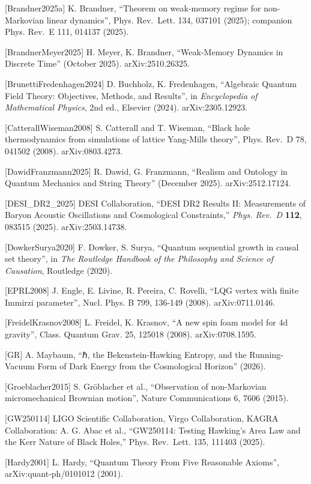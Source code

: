 \documentclass[
]{article}
\begin{document}
{[}Brandner2025a{]} K. Brandner, ``Theorem on weak-memory regime for
non-Markovian linear dynamics'', Phys. Rev.~Lett. 134, 037101 (2025);
companion Phys. Rev.~E 111, 014137 (2025).

{[}BrandnerMeyer2025{]} H. Meyer, K. Brandner, ``Weak-Memory Dynamics in
Discrete Time'' (October 2025). arXiv:2510.26325.

{[}BrunettiFredenhagen2024{]} D. Buchholz, K. Fredenhagen, ``Algebraic
Quantum Field Theory: Objectives, Methods, and Results'', in
\emph{Encyclopedia of Mathematical Physics}, 2nd ed., Elsevier (2024).
arXiv:2305.12923.

{[}CatterallWiseman2008{]} S. Catterall and T. Wiseman, ``Black hole
thermodynamics from simulations of lattice Yang-Mills theory'', Phys.
Rev.~D 78, 041502 (2008). arXiv:0803.4273.

{[}DawidFranzmann2025{]} R. Dawid, G. Franzmann, ``Realism and Ontology
in Quantum Mechanics and String Theory'' (December 2025).
arXiv:2512.17124.

{[}DESI\_DR2\_2025{]} DESI Collaboration, ``DESI DR2 Results II:
Measurements of Baryon Acoustic Oscillations and Cosmological
Constraints,'' \emph{Phys. Rev.~D} \textbf{112}, 083515 (2025).
arXiv:2503.14738.

{[}DowkerSurya2020{]} F. Dowker, S. Surya, ``Quantum sequential growth
in causal set theory'', in \emph{The Routledge Handbook of the
Philosophy and Science of Causation}, Routledge (2020).

{[}EPRL2008{]} J. Engle, E. Livine, R. Pereira, C. Rovelli, ``LQG vertex
with finite Immirzi parameter'', Nucl. Phys. B 799, 136-149 (2008).
arXiv:0711.0146.

{[}FreidelKrasnov2008{]} L. Freidel, K. Krasnov, ``A new spin foam model
for 4d gravity'', Class. Quantum Grav. 25, 125018 (2008).
arXiv:0708.1595.

{[}GR{]} A. Maybaum, ``ℏ, the Bekenstein-Hawking Entropy, and the
Running-Vacuum Form of Dark Energy from the Cosmological Horizon''
(2026).

{[}Groeblacher2015{]} S. Gröblacher et al., ``Observation of
non-Markovian micromechanical Brownian motion'', Nature Communications
6, 7606 (2015).

{[}GW250114{]} LIGO Scientific Collaboration, Virgo Collaboration, KAGRA
Collaboration: A. G. Abac et al., ``GW250114: Testing Hawking's Area Law
and the Kerr Nature of Black Holes,'' Phys. Rev.~Lett. 135, 111403
(2025).

{[}Hardy2001{]} L. Hardy, ``Quantum Theory From Five Reasonable
Axioms'', arXiv:quant-ph/0101012 (2001).
\end{document}
